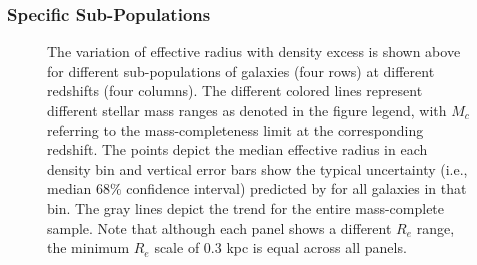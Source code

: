 \subsubsection{Specific Sub-Populations} \label{sec_c4:rad_den_sub}


\begin{figure}
    \begin{center}
  \end{center}
  \caption{The variation of effective radius with density excess is shown above for different sub-populations of galaxies (four rows) at different redshifts (four columns). The different colored lines represent different stellar mass ranges as denoted in the figure legend, with $M_c$ referring to the mass-completeness limit at the corresponding redshift. The points depict the median effective radius in each density bin and vertical error bars show the typical uncertainty (i.e., median $68\%$ confidence interval) predicted by \gampen{} for all galaxies in that bin. The gray lines depict the trend for the entire mass-complete sample. Note that although each panel shows a different $R_e$ range, the minimum $R_e$ scale of $0.3$ kpc is equal across all panels.}
    \label{fig_c4:rad_den_sub}
\end{figure}

